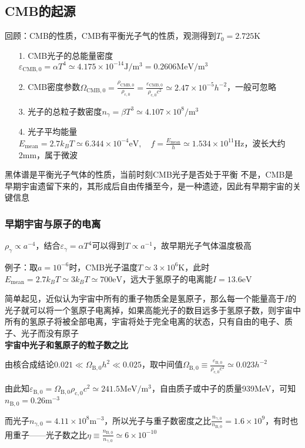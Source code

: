 \subsection{CMB的起源}
\par 
回顾：CMB的性质，CMB有平衡光子气的性质，观测得到$T_0 = 2.725 \mathrm{K}$
\begin{itemize}
	\item[1. ] CMB光子的总能量密度$\varepsilon_{\text{CMB}, 0} = \alpha T^4 \simeq 4.175 \times 10^{-14} \mathrm{J/m^3} = 0.2606 \mathrm{MeV/m^3}$
	\item[2. ] CMB密度参数$\Omega_{\text{CMB}, 0} = \frac{\rho_{\text{CMB}, 0}}{\rho_{\text{c}, 0}} = \frac{\varepsilon_{\text{CMB}, 0}}{\rho_{\text{c}, 0} c^2} \simeq 2.47 \times 10^{-5} h^{-2}$，一般可忽略
	\item[3. ] 光子的总粒子数密度$n_{\gamma} = \beta T^3 \simeq 4.107 \times 10^8 \mathrm{/m^3}$
	\item[4. ] 光子平均能量$E_{\text{mean}} = 2.7 k_B T \simeq 6.344 \times 10^{-4} \mathrm{eV}, \quad f = \frac{E_{\text{mean}}}{h} \simeq 1.534 \times 10^{11} \mathrm{Hz}$，波长大约2mm，属于微波
\end{itemize}

\begin{cbox}
	{黑体谱是平衡光子气体的性质，当前时刻CMB光子是否处于平衡}
	不是，CMB是早期宇宙遗留下来的，其形成后自由传播至今，是一种遗迹，因此有早期宇宙的关键信息
\end{cbox}

\subsubsection{早期宇宙与原子的电离}
\par 
$\rho_{\gamma} \propto a^{-4}$，结合$\varepsilon_{\gamma} = \alpha T^4$可以得到$T \propto a^{-1}$，故早期光子气体温度极高 
\par 
例子：取$a = 10^{-6}$时，CMB光子温度$T \simeq 3 \times 10^{6} \mathrm{K}$，此时$E_{\text{mean}} = 2.7 k_B T \simeq 3 k_B T \simeq 700 \mathrm{eV}$，远大于氢原子的电离能$I = 13.6 \mathrm{eV}$
\par 
简单起见，近似认为宇宙中所有的重子物质全是氢原子，那么每一个能量高于$I$的光子就可以将一个氢原子电离掉，如果高能光子的数目远多于氢原子数，则宇宙中所有的氢原子将被全部电离，宇宙将处于完全电离的状态，只有自由的电子、质子、光子而没有原子
\\
\textbf{宇宙中光子和氢原子的粒子数之比}
\par 
由核合成结论$0.021 \ll \Omega_{\text{B}, 0} h^2 \ll 0.025$，取中间值$\Omega_{\text{B}, 0} \equiv \frac{\varepsilon_{\text{B}, 0}}{\rho_{\text{c}, 0} c^2} \simeq 0.023 h^{-2}$ 
\par 
由此知$\varepsilon_{\text{B}, 0} = \Omega_{\text{B}, 0} \rho_{\text{c}, 0} c^2 \simeq 241.5 \mathrm{MeV/m^3}$，自由质子或中子的质量939MeV，可知$n_{\text{B}, 0} = 0.26 \mathrm{m^{-3}}$
\par 
而光子$n_{\gamma, 0} = 4.11 \times 10^8 \mathrm{m^{-3}}$，所以光子与重子数密度之比$\frac{n_{\gamma, 0}}{n_{\text{B}, 0}} = 1.6 \times 10^9$，有时也用重子——光子数之比$\eta \equiv \frac{n_{\text{B}, 0}}{n_{\gamma, 0}} \simeq 6 \times 10^{-10}$

